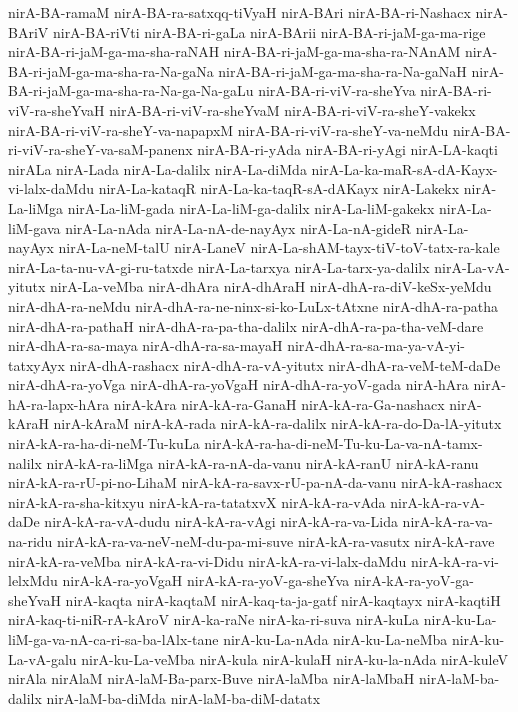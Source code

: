 {nirA-BA-ramaM
nirA-BA-ra-satxqq-tiVyaH
nirA-BAri
nirA-BA-ri-Nashacx
nirA-BAriV
nirA-BA-riVti
nirA-BA-ri-gaLa
nirA-BArii
nirA-BA-ri-jaM-ga-ma-rige
nirA-BA-ri-jaM-ga-ma-sha-raNAH
nirA-BA-ri-jaM-ga-ma-sha-ra-NAnAM
nirA-BA-ri-jaM-ga-ma-sha-ra-Na-gaNa
nirA-BA-ri-jaM-ga-ma-sha-ra-Na-gaNaH
nirA-BA-ri-jaM-ga-ma-sha-ra-Na-ga-Na-gaLu
nirA-BA-ri-viV-ra-sheYva
nirA-BA-ri-viV-ra-sheYvaH
nirA-BA-ri-viV-ra-sheYvaM
nirA-BA-ri-viV-ra-sheY-vakekx
nirA-BA-ri-viV-ra-sheY-va-napapxM
nirA-BA-ri-viV-ra-sheY-va-neMdu
nirA-BA-ri-viV-ra-sheY-va-saM-panenx
nirA-BA-ri-yAda
nirA-BA-ri-yAgi
nirA-LA-kaqti
nirALa
nirA-Lada
nirA-La-dalilx
nirA-La-diMda
nirA-La-ka-maR-sA-dA-Kayx-vi-lalx-daMdu
nirA-La-kataqR
nirA-La-ka-taqR-sA-dAKayx
nirA-Lakekx
nirA-La-liMga
nirA-La-liM-gada
nirA-La-liM-ga-dalilx
nirA-La-liM-gakekx
nirA-La-liM-gava
nirA-La-nAda
nirA-La-nA-de-nayAyx
nirA-La-nA-gideR
nirA-La-nayAyx
nirA-La-neM-talU
nirA-LaneV
nirA-La-shAM-tayx-tiV-toV-tatx-ra-kale
nirA-La-ta-nu-vA-gi-ru-tatxde
nirA-La-tarxya
nirA-La-tarx-ya-dalilx
nirA-La-vA-yitutx
nirA-La-veMba
nirA-dhAra
nirA-dhAraH
nirA-dhA-ra-diV-keSx-yeMdu
nirA-dhA-ra-neMdu
nirA-dhA-ra-ne-ninx-si-ko-LuLx-tAtxne
nirA-dhA-ra-patha
nirA-dhA-ra-pathaH
nirA-dhA-ra-pa-tha-dalilx
nirA-dhA-ra-pa-tha-veM-dare
nirA-dhA-ra-sa-maya
nirA-dhA-ra-sa-mayaH
nirA-dhA-ra-sa-ma-ya-vA-yi-tatxyAyx
nirA-dhA-rashacx
nirA-dhA-ra-vA-yitutx
nirA-dhA-ra-veM-teM-daDe
nirA-dhA-ra-yoVga
nirA-dhA-ra-yoVgaH
nirA-dhA-ra-yoV-gada
nirA-hAra
nirA-hA-ra-lapx-hAra
nirA-kAra
nirA-kA-ra-GanaH
nirA-kA-ra-Ga-nashacx
nirA-kAraH
nirA-kAraM
nirA-kA-rada
nirA-kA-ra-dalilx
nirA-kA-ra-do-Da-lA-yitutx
nirA-kA-ra-ha-di-neM-Tu-kuLa
nirA-kA-ra-ha-di-neM-Tu-ku-La-va-nA-tamx-nalilx
nirA-kA-ra-liMga
nirA-kA-ra-nA-da-vanu
nirA-kA-ranU
nirA-kA-ranu
nirA-kA-ra-rU-pi-no-LihaM
nirA-kA-ra-savx-rU-pa-nA-da-vanu
nirA-kA-rashacx
nirA-kA-ra-sha-kitxyu
nirA-kA-ra-tatatxvX
nirA-kA-ra-vAda
nirA-kA-ra-vA-daDe
nirA-kA-ra-vA-dudu
nirA-kA-ra-vAgi
nirA-kA-ra-va-Lida
nirA-kA-ra-va-na-ridu
nirA-kA-ra-va-neV-neM-du-pa-mi-suve
nirA-kA-ra-vasutx
nirA-kA-rave
nirA-kA-ra-veMba
nirA-kA-ra-vi-Didu
nirA-kA-ra-vi-lalx-daMdu
nirA-kA-ra-vi-lelxMdu
nirA-kA-ra-yoVgaH
nirA-kA-ra-yoV-ga-sheYva
nirA-kA-ra-yoV-ga-sheYvaH
nirA-kaqta
nirA-kaqtaM
nirA-kaq-ta-ja-gatf
nirA-kaqtayx
nirA-kaqtiH
nirA-kaq-ti-niR-rA-kAroV
nirA-ka-raNe
nirA-ka-ri-suva
nirA-kuLa
nirA-ku-La-liM-ga-va-nA-ca-ri-sa-ba-lAlx-tane
nirA-ku-La-nAda
nirA-ku-La-neMba
nirA-ku-La-vA-galu
nirA-ku-La-veMba
nirA-kula
nirA-kulaH
nirA-ku-la-nAda
nirA-kuleV
nirAla
nirAlaM
nirA-laM-Ba-parx-Buve
nirA-laMba
nirA-laMbaH
nirA-laM-ba-dalilx
nirA-laM-ba-diMda
nirA-laM-ba-diM-datatx
}

